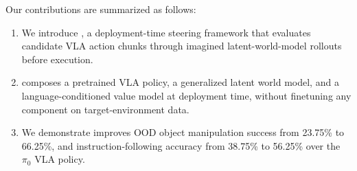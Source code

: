 Our contributions are summarized as follows:
\begin{enumerate}[leftmargin=*, noitemsep, topsep=2pt]
\item We introduce \textbf{\coolname{}}, a deployment-time steering framework that evaluates candidate VLA action chunks through imagined latent-world-model rollouts before execution.

\item \coolname{} composes a pretrained VLA policy, a generalized latent world model, and a language-conditioned value model at deployment time, without finetuning any component on target-environment data.

\item We demonstrate \coolname{} improves OOD object manipulation success from 23.75\% to 66.25\%, and instruction-following accuracy from 38.75\% to 56.25\% over the $\pi_0$ VLA policy.
\end{enumerate}